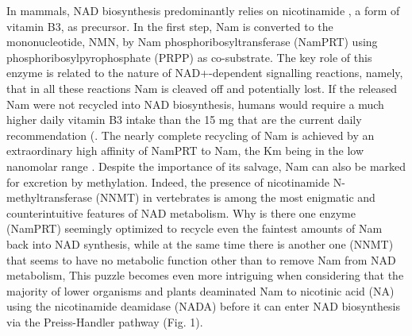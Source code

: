 In mammals, NAD biosynthesis predominantly relies on nicotinamide \cite{?}, a form of vitamin B3, as precursor. In the first step, Nam is converted to the mononucleotide, NMN, by Nam phosphoribosyltransferase (NamPRT) using phosphoribosylpyrophosphate (PRPP) as co-substrate. The key role of this enzyme is related to the nature of NAD+-dependent signalling reactions, namely, that in all these reactions Nam is cleaved off and potentially lost. If the released Nam were not recycled into NAD biosynthesis, humans would require a much higher daily vitamin B3 intake than the 15 mg that are the current daily recommendation  \cite{?}(. The nearly complete recycling of Nam is achieved by an extraordinary high affinity of NamPRT to Nam, the Km being in the low nanomolar range \cite{Burgos2008}. Despite the importance of its salvage, Nam can also be marked for excretion by methylation. Indeed, the presence of nicotinamide N-methyltransferase (NNMT) in vertebrates \cite{Gossmann2012} is among the most enigmatic and counterintuitive features of NAD metabolism. Why is there one enzyme (NamPRT) seemingly optimized to recycle even the faintest amounts of Nam back into NAD synthesis, while at the same time there is another one (NNMT) that seems to have no metabolic function other than to remove Nam from NAD metabolism, This puzzle becomes even more intriguing when considering that the majority of lower organisms and plants deaminated Nam to nicotinic acid (NA) using the nicotinamide deamidase (NADA) before it can enter NAD biosynthesis via the Preiss-Handler pathway (Fig. 1). 

